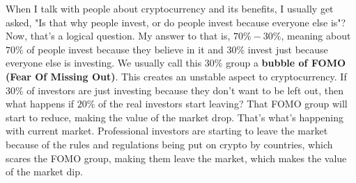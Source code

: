 \begin{essay}

  When I talk with people about cryptocurrency and its benefits, I usually get
  asked, "Is that why people invest, or do people invest because everyone else
  is"? Now, that's a logical question. My answer to that is, $70\%-30\%
  $, meaning about $70\%$ of people invest because they believe in it and
  $30\%$ invest just because everyone else is investing. We usually call this
  $30\%$ group a \textbf{bubble of FOMO (Fear Of Missing Out)}. This creates an
  unstable aspect to cryptocurrency. If $30\%$ of investors are just investing
  because they don't want to be left out, then what happens if $20\%$ of the
  real investors start leaving? That FOMO group will start to reduce, making
  the value of the market drop. That's what's happening with current market.
  Professional investors are starting to leave the market because of the rules
  and regulations being put on crypto by countries, which scares the FOMO
  group, making them leave the market, which makes the value of the market dip.





\end{essay}
